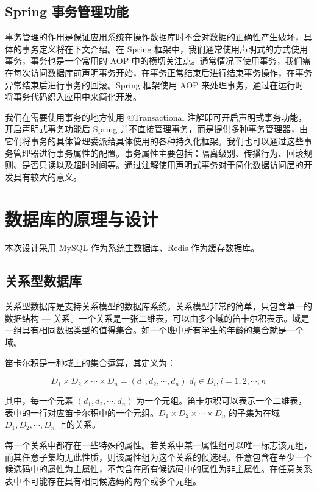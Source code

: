  \subsection{Spring 事务管理功能}
 
 事务管理的作用是保证应用系统在操作数据库时不会对数据的正确性产生破坏，具体的事务定义将在下文介绍。在 Spring 框架中，我们通常使用声明式的方式使用事务，事务也是一个常用的 AOP 中的横切关注点。通常情况下使用事务，我们需在每次访问数据库前声明事务开始，在事务正常结束后进行结束事务操作，在事务异常结束后进行事务的回滚。Spring 框架使用 AOP 来处理事务，通过在运行时将事务代码织入应用中来简化开发。
 
 我们在需要使用事务的地方使用 @Transactional 注解即可开启声明式事务功能，开启声明式事务功能后 Spring 并不直接管理事务，而是提供多种事务管理器，由它们将事务的具体管理委派给具体使用的各种持久化框架。我们也可以通过这些事务管理器进行事务属性的配置。事务属性主要包括：隔离级别、传播行为、回滚规则、是否只读以及超时时间等。通过注解使用声明式事务对于简化数据访问层的开发具有较大的意义。


\section{数据库的原理与设计}

本次设计采用 MySQL 作为系统主数据库、Redis 作为缓存数据库。


\subsection{关系型数据库}
关系型数据库是支持关系模型的数据库系统。关系模型非常的简单，只包含单一的数据结构 --- 关系。一个关系是一张二维表，可以由多个域的笛卡尔积表示。域是一组具有相同数据类型的值得集合。如一个班中所有学生的年龄的集合就是一个域。

笛卡尔积是一种域上的集合运算，其定义为：

\begin{equation}
\label{eq:Descartes}
D_1 \times D_2 \times \cdots \times D_n = {(d_1, d_2, \cdots, d_n) | d_i \in D_i, i=1, 2, \cdots, n}
\end{equation}

其中，每一个元素 $(d_1, d_2, \cdots, d_n)$ 为一个元组。笛卡尔积可以表示一个二维表，表中的一行对应笛卡尔积中的一个元组。$D_1 \times D_2 \times \cdots \times D_n$ 的子集为在域 $D_1, D_2, \cdots, D_n$ 上的关系。

每一个关系中都存在一些特殊的属性。若关系中某一属性组可以唯一标志该元组，而其任意子集均无此性质，则该属性组为这个关系的候选码。任意包含在至少一个候选码中的属性为主属性，不包含在所有候选码中的属性为非主属性。在任意关系表中不可能存在具有相同候选码的两个或多个元组。

